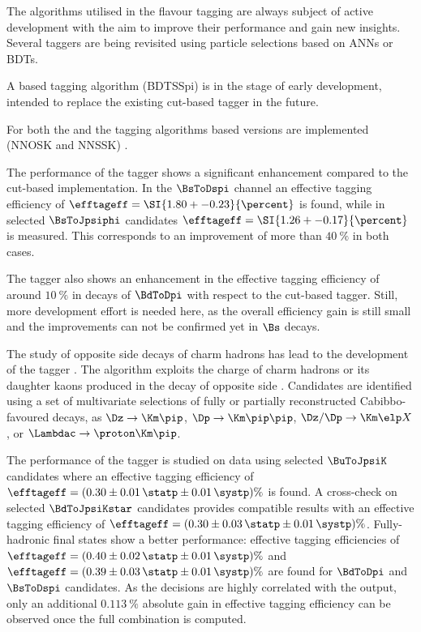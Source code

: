 The algorithms utilised in the flavour tagging are always subject of active
development with the aim to improve their performance and gain new insights.
Several taggers are being revisited using particle selections based on
\acfp{ANN} or \acfp{BDT}.

A \BDT based \SSpi tagging algorithm (\acs{BDTSSpi}) is in the stage of early
development, intended to replace the existing cut-based \SSpi tagger in the
future.

For both the \OSK and the \SSK tagging algorithms \ANN based versions are
implemented (\acs{NNOSK} and \acs{NNSSK}) \cite{FT:ANAKaonNNet,FT:KaonNNet}. 

The performance of the \NNSSK tagger shows a significant enhancement compared to
the cut-based \SSK implementation. In the $\BsToDspi$ channel an effective
tagging efficiency of $\efftageff = \SI{1.80 +- 0.23}{\percent}$ is found, while
in selected $\BsToJpsiphi$ candidates $\efftageff = \SI{1.26 +- 0.17}{\percent}$
is measured. This corresponds to an improvement of more than $\SI{40}{\percent}$
in both cases.

The \NNOSK tagger also shows an enhancement in the effective tagging efficiency
of around $\SI{10}{\percent}$ in decays of $\BdToDpi$ with respect to the
cut-based \OSK tagger. Still, more development effort is needed here, as the
overall efficiency gain is still small and the improvements can not be confirmed
yet in $\Bs$ decays.

The study of opposite side decays of charm hadrons has lead to the development
of the \OSc tagger \cite{FT:OSCharm}. The \OSc algorithm exploits the charge of
charm hadrons or its daughter kaons produced in the decay of opposite side
\bhadrons. Candidates are identified using a set of multivariate selections of
fully or partially reconstructed Cabibbo-favoured decays, as \eg
$\Dz\to\Km\pip$, $\Dp\to\Km\pip\pip$, $\Dz/\Dp\to\Km\elp X$, or
$\Lambdac\to\proton\Km\pip$. 

The performance of the \OSc tagger is studied on data using selected
$\BuToJpsiK$ candidates where an effective tagging efficiency of $\efftageff =
(0.30 \pm 0.01\,\statp \pm 0.01\,\systp)\%$ is found. A cross-check on selected
$\BdToJpsiKstar$ candidates provides compatible results with an effective
tagging efficiency of $\efftageff = (0.30 \pm 0.03\,\statp \pm 0.01\,\systp)\%$.
Fully-hadronic final states show a better performance: effective tagging
efficiencies of $\efftageff = (0.40 \pm 0.02\,\statp \pm 0.01\,\systp)\%$ and
$\efftageff = (0.39 \pm 0.03\,\statp \pm 0.01\,\systp)\%$ are found for
$\BdToDpi$ and $\BsToDspi$ candidates.
As the \OSc decisions are highly correlated with the \OSK output, only an
additional $\SI{0.113}{\percent}$ absolute gain in effective tagging efficiency
can be observed once the full \OS combination is computed.

